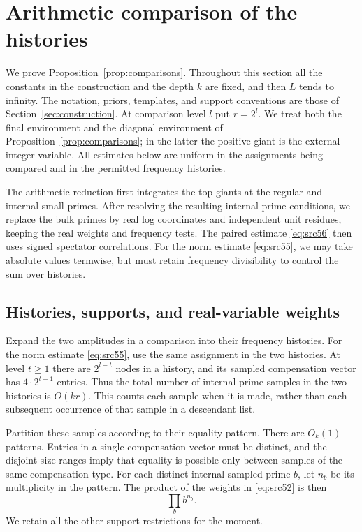 \section{Arithmetic comparison of the histories}\label{sec:arithmetic}

We prove Proposition~\ref{prop:comparisons}. Throughout this section all the
constants in the construction and the depth $k$ are fixed, and then $L$ tends
to infinity. The notation, priors, templates, and support conventions are
those of Section~\ref{sec:construction}. At comparison level $l$ put $r=2^l$.
We treat both the final environment and the diagonal environment of
Proposition~\ref{prop:comparisons}; in the latter the positive giant is the
external integer variable. All estimates below are uniform in the assignments
being compared and in the permitted frequency histories.

The arithmetic reduction first integrates the top giants at the regular
and internal small primes. After resolving the resulting internal-prime
conditions, we replace the bulk primes by real log coordinates and independent
unit residues, keeping the real weights and frequency tests. The paired
estimate \eqref{eq:src56} then uses signed spectator correlations. For the
norm estimate \eqref{eq:src55}, we may take absolute values termwise, but
must retain frequency divisibility to control the sum over histories.

\subsection{Histories, supports, and real-variable weights}

Expand the two amplitudes in a comparison into their frequency histories.
For the norm estimate \eqref{eq:src55}, use the same assignment in the two
histories. At level $t\geq1$ there are $2^{l-t}$ nodes in a history, and its
sampled compensation vector has $4\cdot2^{t-1}$ entries. Thus the total
number of internal prime samples in the two histories is $O(kr)$. This counts
each sample when it is made, rather than each subsequent occurrence of that
sample in a descendant list.

Partition these samples according to their equality pattern. There are
$O_k(1)$ patterns. Entries in a single compensation vector must be distinct,
and the disjoint size ranges imply that equality is possible only between
samples of the same compensation type. For each distinct internal sampled
prime $b$, let $n_b$ be its multiplicity in the pattern. The product of the
weights in \eqref{eq:src52} is then
\[
                         \prod_b b^{n_b}.
\]
We retain all the other support restrictions for the moment.

